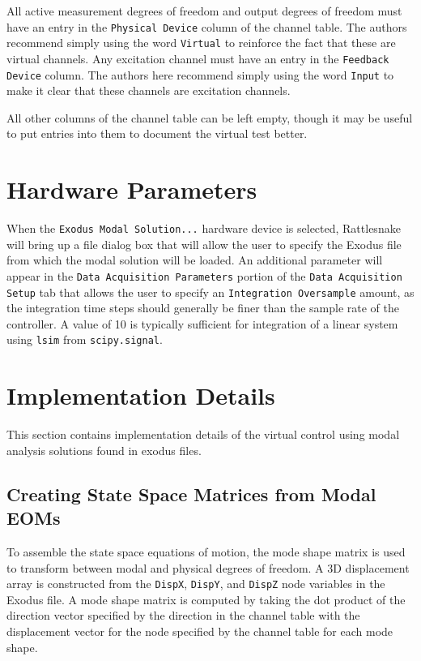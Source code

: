 \documentclass[pdf,12pt,report]{SANDreport}
\newcommand{\inlineCode}{\lstinline[basicstyle=\bfseries\ttfamily]}
\begin{document}
    All active measurement degrees of freedom and output degrees of freedom must have an entry in the \inlineCode{Physical Device} column of the channel table.  The authors recommend simply using the word \inlineCode{Virtual} to reinforce the fact that these are virtual channels.  Any excitation channel must have an entry in the \inlineCode{Feedback Device} column.  The authors here recommend simply using the word \inlineCode{Input} to make it clear that these channels are excitation channels.
    
    All other columns of the channel table can be left empty, though it may be useful to put entries into them to document the virtual test better.
    
    \section{Hardware Parameters}
    When the \inlineCode{Exodus Modal Solution...} hardware device is selected, Rattlesnake will bring up a file dialog box that will allow the user to specify the Exodus file from which the modal solution will be loaded.  An additional parameter will appear in the \inlineCode{Data Acquisition Parameters} portion of the \inlineCode{Data Acquisition Setup} tab that allows the user to specify an \inlineCode{Integration Oversample} amount, as the integration time steps should generally be finer than the sample rate of the controller.  A value of 10 is typically sufficient for integration of a linear system using \inlineCode{lsim} from \inlineCode{scipy.signal}.
    
    \section{Implementation Details}
    This section contains implementation details of the virtual control using modal analysis solutions found in exodus files. 
    
    \subsection{Creating State Space Matrices from Modal EOMs}
    To assemble the state space equations of motion, the mode shape matrix is used to transform between modal and physical degrees of freedom.  A 3D displacement array is constructed from the \inlineCode{DispX}, \inlineCode{DispY}, and \inlineCode{DispZ} node variables in the Exodus file.  A mode shape matrix is computed by taking the dot product of the direction vector specified by the direction in the channel table with the displacement vector for the node specified by the channel table for each mode shape.
    
\end{document}
